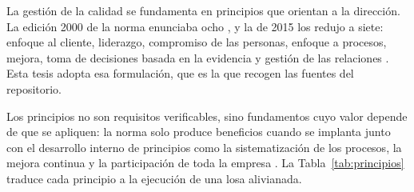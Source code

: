 La gestión de la calidad se fundamenta en principios que orientan a la dirección. La edición 2000 de la norma enunciaba ocho \parencite[p.~199]{romero2007}, y la de 2015 los redujo a siete: enfoque al cliente, liderazgo, compromiso de las personas, enfoque a procesos, mejora, toma de decisiones basada en la evidencia y gestión de las relaciones \parencite[p.~59]{pena2024}. Esta tesis adopta esa formulación, que es la que recogen las fuentes del repositorio. 

Los principios no son requisitos verificables, sino fundamentos cuyo valor depende de que se apliquen: la norma solo produce beneficios cuando se implanta junto con el desarrollo interno de principios como la sistematización de los procesos, la mejora continua y la participación de toda la empresa \parencite[p.~152]{pradoroman2018}. La Tabla~\ref{tab:principios} traduce cada principio a la ejecución de una losa alivianada.

